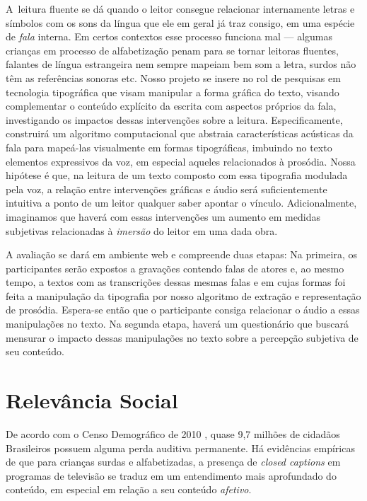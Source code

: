\documentclass[a4paper,11pt,titlepage,singlespacing]{article}
\begin{document}
\newpage

\abstract

\noindent A~leitura fluente se dá quando o leitor consegue relacionar internamente letras e símbolos com os sons da língua que ele em geral já traz consigo, em uma espécie de \textit{fala} interna. Em certos contextos esse processo funciona mal — algumas crianças em processo de alfabetização penam para se tornar leitoras fluentes, falantes de língua estrangeira nem sempre mapeiam bem som a letra, surdos não têm as referências sonoras etc. Nosso projeto se insere no rol de pesquisas em tecnologia tipográfica que visam manipular a forma gráfica do texto, visando complementar o conteúdo explícito da escrita com aspectos próprios da fala, investigando os impactos dessas intervenções sobre a leitura. Especificamente, construirá um algoritmo computacional que abstraia características acústicas da fala para mapeá-las visualmente em formas tipográficas, imbuindo no texto elementos expressivos da voz, em especial aqueles relacionados à prosódia. Nossa hipótese é que, na leitura de um texto composto com essa tipografia modulada pela voz, a relação entre intervenções gráficas e áudio será suficientemente intuitiva a ponto de um leitor qualquer saber apontar o vínculo. Adicionalmente, imaginamos que haverá com essas intervenções um aumento em medidas subjetivas relacionadas à \textit{imersão} do leitor em uma dada obra.

A avaliação se dará em ambiente web e compreende duas etapas: Na primeira, os participantes serão expostos a gravações contendo falas de atores e, ao mesmo tempo, a textos com as transcrições dessas mesmas falas e em cujas formas foi feita a manipulação da tipografia por nosso algoritmo de extração e representação de prosódia. Espera-se então que o participante consiga relacionar o áudio a essas manipulações no texto. Na segunda etapa, haverá um questionário que buscará mensurar o impacto dessas manipulações no texto sobre a percepção subjetiva de seu conteúdo.

\newpage


\thispagestyle{empty}
\newpage


\newpage

\section*{Relevância Social}

\noindent De acordo com o Censo Demográfico de 2010 \cite{censo2010}, quase 9,7 milhões de cidadãos Brasileiros possuem alguma perda auditiva permanente. Há evidências empíricas \cite{murphy-berman_impact_1983} de que para crianças surdas e alfabetizadas, a presença de \textit{closed captions} em programas de televisão se traduz em um entendimento mais aprofundado do conteúdo, em especial em relação a seu conteúdo \textit{afetivo}.
\end{document}
